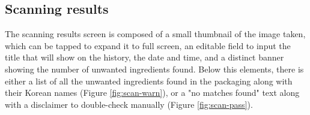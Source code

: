 \clearpage

\subsection{Scanning results}

The scanning results screen is composed of a small thumbnail of the image taken, which can be tapped to expand it to full screen, an editable field to input the title that will show on the history, the date and time, and a distinct banner showing the number of unwanted ingredients found. Below this elements, there is either a list of all the unwanted ingredients found in the packaging along with their Korean names (Figure \ref{fig:scan-warn}), or a "no matches found" text along with a disclaimer to double-check manually (Figure \ref{fig:scan-pass}).

